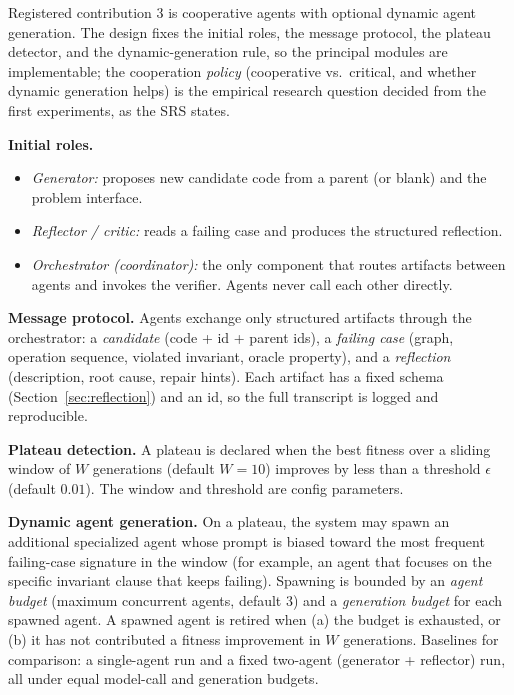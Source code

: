 \documentclass[12pt,a4paper]{article}
\begin{document}
Registered contribution 3 is cooperative agents with optional dynamic agent generation. The design fixes the initial roles, the message protocol, the plateau detector, and the dynamic-generation rule, so the principal modules are implementable; the cooperation \emph{policy} (cooperative vs.\ critical, and whether dynamic generation helps) is the empirical research question decided from the first experiments, as the SRS states.

\textbf{Initial roles.}
\begin{itemize}[noitemsep]
  \item \emph{Generator:} proposes new candidate code from a parent (or blank) and the problem interface.
  \item \emph{Reflector / critic:} reads a failing case and produces the structured reflection.
  \item \emph{Orchestrator (coordinator):} the only component that routes artifacts between agents and invokes the verifier. Agents never call each other directly.
\end{itemize}

\textbf{Message protocol.} Agents exchange only structured artifacts through the orchestrator: a \emph{candidate} (code + id + parent ids), a \emph{failing case} (graph, operation sequence, violated invariant, oracle property), and a \emph{reflection} (description, root cause, repair hints). Each artifact has a fixed schema (Section~\ref{sec:reflection}) and an id, so the full transcript is logged and reproducible.

\textbf{Plateau detection.} A plateau is declared when the best fitness over a sliding window of $W$ generations (default $W=10$) improves by less than a threshold $\epsilon$ (default $0.01$). The window and threshold are config parameters.

\textbf{Dynamic agent generation.} On a plateau, the system may spawn an additional specialized agent whose prompt is biased toward the most frequent failing-case signature in the window (for example, an agent that focuses on the specific invariant clause that keeps failing). Spawning is bounded by an \emph{agent budget} (maximum concurrent agents, default 3) and a \emph{generation budget} for each spawned agent. A spawned agent is retired when (a) the budget is exhausted, or (b) it has not contributed a fitness improvement in $W$ generations. Baselines for comparison: a single-agent run and a fixed two-agent (generator + reflector) run, all under equal model-call and generation budgets.
\end{document}
